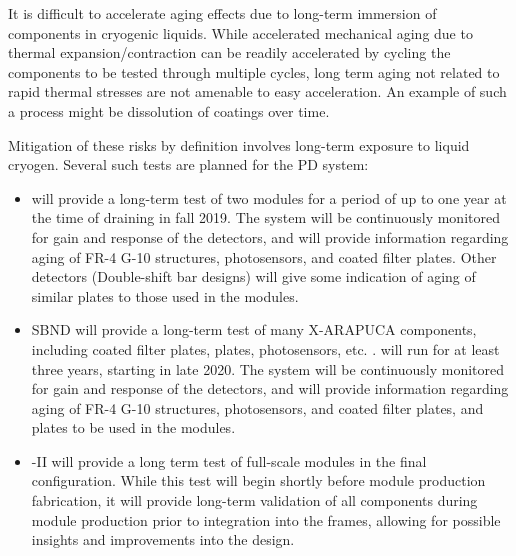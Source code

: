 
It is difficult to accelerate aging effects due to long-term immersion of components in cryogenic liquids.  While accelerated mechanical aging due to thermal expansion/contraction can be readily accelerated by cycling the components to be tested through multiple cycles, long term aging not related to rapid thermal stresses are not amenable to easy acceleration.  An example of such a process might be dissolution of  coatings over time.

Mitigation of these risks by definition involves long-term exposure to liquid cryogen.  Several such tests are planned for the PD system:

\begin{itemize}

    \item {} will provide a long-term test of two  modules for a period of up to one year at the time of draining in fall 2019.  The system will be continuously monitored for gain and response of the detectors, and will provide information regarding aging of FR-4 G-10 structures, photosensors, and coated filter plates.  Other  detectors (Double-shift bar designs) will give some indication of aging of similar  plates to those used in the  modules.
    \item SBND will provide a long-term test of many X-ARAPUCA components, including coated filter plates,  plates, photosensors, etc. .   will run for at least three years, starting in late 2020.  The system will be continuously monitored for gain and response of the detectors, and will provide information regarding aging of FR-4 G-10 structures, photosensors, and coated filter plates, and  plates to be used in the  modules.
    \item {}-II will provide a long term test of full-scale  modules in the final  configuration. While this test will begin shortly before   module production fabrication, it will provide long-term validation of all  components during module production prior to integration into the  frames, allowing for possible insights and improvements into the  design.

\end{itemize}


